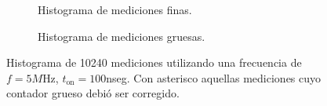 \begin{figure}[H]
     \centering
     \begin{subfigure}[t]{0.45\textwidth} %
           \centering
           \caption{Histograma de mediciones finas.}
           \label{fig: histograma_66}
     \end{subfigure}%
     \hspace{10pt}%
     \begin{subfigure}[t]{0.4\textwidth} %
           \centering
           \caption{Histograma de mediciones gruesas.}
     \end{subfigure}
     \caption{Histograma de 10240 mediciones utilizando una frecuencia de $f=5M$Hz, $t_{\text{on}}=100$nseg. 
     Con asterisco aquellas mediciones cuyo contador grueso debió ser corregido.}
\end{figure}



